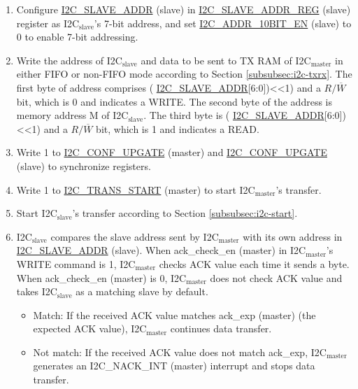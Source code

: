 \documentclass[main\_\_EN.tex]{subfiles}
\begin{document}
\begin{enumerate}
\item Configure \hyperref[fielddesc:I2CSLAVEADDR]{I2C\_SLAVE\_ADDR} (slave) in \hyperref[regdesc:I2CSLAVEADDRREG]{I2C\_SLAVE\_ADDR\_REG} (slave) register as I2C$_\text{slave}$'s 7-bit address, and set \hyperref[fielddesc:I2CADDR10BITEN]{I2C\_ADDR\_10BIT\_EN} (slave) to 0 to enable 7-bit addressing.
\item Write the address of I2C$_\text{slave}$ and data to be sent to TX RAM of I2C$_\text{master}$ in either FIFO or non-FIFO mode according to Section \ref{subsubsec:i2c-txrx}. The first byte of address comprises ( \hyperref[fielddesc:I2CSLAVEADDR]{I2C\_SLAVE\_ADDR}[6:0])<<1) and a $R/\overline W$ bit, which is 0 and indicates a WRITE. The second byte of the address is memory address M of I2C$_\text{slave}$. The third byte is ( \hyperref[fielddesc:I2CSLAVEADDR]{I2C\_SLAVE\_ADDR}[6:0])<<1) and a $R/\overline W$ bit, which is 1 and indicates a READ.
\item Write 1 to \hyperref[fielddesc:I2CCONFUPGATE]{I2C\_CONF\_UPGATE} (master) and \hyperref[fielddesc:I2CCONFUPGATE]{I2C\_CONF\_UPGATE} (slave) to synchronize registers.
\item Write 1 to \hyperref[fielddesc:I2CTRANSSTART]{I2C\_TRANS\_START} (master) to start I2C$_\text{master}$'s transfer.
\item Start I2C$_\text{slave}$'s transfer according to Section \ref{subsubsec:i2c-start}.
\item I2C$_\text{slave}$ compares the slave address sent by I2C$_\text{master}$ with its own address in \hyperref[fielddesc:I2CSLAVEADDR]{I2C\_SLAVE\_ADDR} (slave). When ack\_check\_en (master) in I2C$_\text{master}$'s WRITE command is 1, I2C$_\text{master}$ checks ACK value each time it sends a byte. When ack\_check\_en (master) is 0, I2C$_\text{master}$ does not check ACK value and takes I2C$_\text{slave}$ as a matching slave by default.

\begin{itemize}
\item Match: If the received ACK value matches ack\_exp (master) (the expected ACK value), I2C$_\text{master}$ continues data transfer.
\item Not match: If the received ACK value does not match ack\_exp, I2C$_\text{master}$ generates an I2C\_NACK\_INT (master) interrupt and stops data transfer.
\end{itemize}


\end{enumerate}
\end{document}
